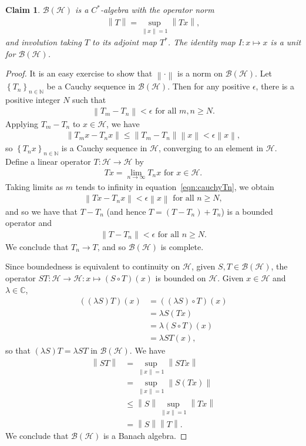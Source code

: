 \documentclass[11pt,a4paper]{report}
\theoremstyle{plain}
\newtheorem*{claim}{Claim}
\theoremstyle{definition}
\newcommand{\1}{\mathbbm{1}}
\newcommand{\C}{\mathbb{C}}
\newcommand{\N}{\mathbb{N}}
\renewcommand{\H}{\mathcal{H}}
\newcommand{\B}{\mathcal{B}}
\newcommand{\BH}{\mathcal{\B(\H)}}
\begin{document}
\begin{claim} 
	$\B(\H)$ is a $C^\ast$-algebra with the operator norm 
	\begin{align*}
		\left\|T\right\|= \sup_{\left\|x\right\|=1}{\left\|Tx\right\|},
	\end{align*}
	and involution taking $T$ to its adjoint map $T^\ast$. 
	The identity map $I:x\mapsto x$ is a unit for $\BH$.
\end{claim}
\begin{proof}
	It is an easy exercise to show that $\left\|\cdot\right\|$ is a norm on $\BH$. 
	Let $\left\{T_n\right\}_{n\in\N}$ be a Cauchy sequence in $\BH$. Then for any 
	positive $\epsilon$, there is a positive integer $N$ such that 
	\begin{align*}
		\left\|T_m-T_n\right\| < \epsilon \mbox{ for all } m,n \geq N.
	\end{align*}
	Applying $T_m-T_n$ to $x \in \H$, we have 
	\begin{align}\label{eqn:cauchyTn}
		\left\|T_mx-T_nx\right\| 	\leq \left\|T_m-T_n\right\| \left\|x\right\| 
									< \epsilon \left\|x\right\|,
	\end{align}
	so $\left\{T_n x\right\}_{n\in\N}$ is a Cauchy sequence in $\H$, converging to 
	an element in $\H$. Define a linear operator $T:\H \to \H$ by 
	\begin{align*}
		Tx= \lim_{n\to\infty}{T_nx} \mbox{ for } x \in \H.
	\end{align*}
	Taking limits as $m$ tends to infinity in equation~\eqref{eqn:cauchyTn}, we obtain
	\begin{align*}
		\left\|Tx-T_nx\right\| < \epsilon \left\|x\right\| \mbox{ for all }n \geq N,
	\end{align*}
	and so we have that $T-T_n$ (and hence $T=(T-T_n)+T_n$) is a bounded operator and  
	\begin{align*}
		\left\|T-T_n\right\| <\epsilon \mbox{ for all }n \geq N.
	\end{align*}
	We conclude that $T_n \to T$, and so $\BH$ is complete.
	
	Since boundedness is equivalent to continuity on $\H$, given $S,T\in\BH$, the 
	operator $ST:\H \to \H: x \mapsto (S\circ T)(x)$ is bounded on $\H$. Given 
	$x\in\H$ and $\lambda\in\C$, 
	\begin{align*}
			((\lambda S)T)(x)
		&=	((\lambda S)\circ T)(x)															\\
		&=	\lambda S(Tx)																	\\
		&=	\lambda (S\circ T)(x)															\\
		&=	\lambda ST(x),		
	\end{align*} 
	so that $(\lambda S)T = \lambda ST$ in $\BH$. We have 
	\begin{align*}
				\left\|ST\right\|
		&=		\sup_{\left\|x\right\|=1}{\left\|STx\right\|} 								\\
		&=		\sup_{\left\|x\right\|=1}{\left\|S(Tx)\right\|} 							\\
		&\leq	\left\|S\right\| \sup_{\left\|x\right\|=1}{\left\|Tx\right\|} 				\\
		&=		\left\|S\right\| \left\|T\right\|.
	\end{align*}
	We conclude that $\BH$ is a Banach algebra.
	

\end{proof}
\end{document}
